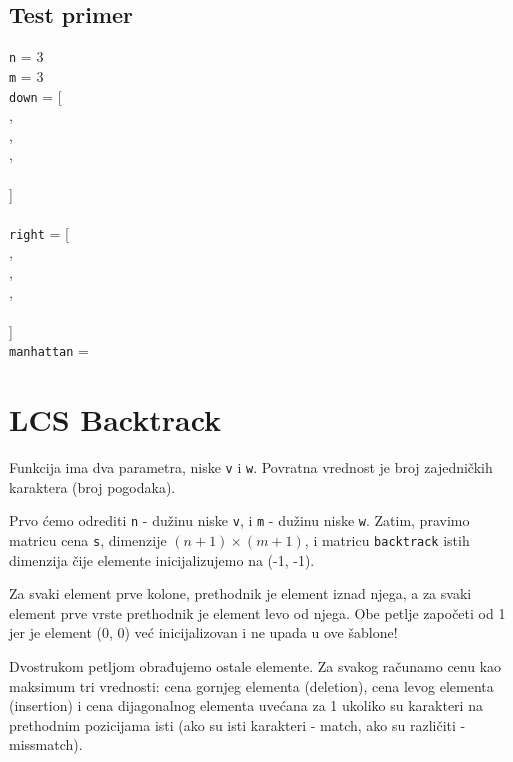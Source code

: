 

\subsection{Test primer}

\noindent \texttt{n} = 3
\\\texttt{m} = 3
\\ \noindent\texttt{down} = [
\\\indent[0, 0, 0, 0],
\\\indent[0, 1, 2, 1],
\\\indent[0, 1, 1, 1],
\\\indent[0, 1, 1, 1]
\\]
\\
\\ \texttt{right} = [
\\\indent[0, 0, 0, 1],
\\\indent[0, 3, 5, 1],
\\\indent[0, 1, 0, 1],
\\\indent[0, 1, 0, 1]
\\]
\\\texttt{manhattan} = 

\section{LCS Backtrack}

Funkcija ima dva parametra, niske \texttt{v} i \texttt{w}. Povratna vrednost je broj zajedničkih karaktera (broj pogodaka).

Prvo ćemo odrediti \texttt{n} - dužinu niske \texttt{v}, i \texttt{m} - dužinu niske \texttt{w}. Zatim, pravimo matricu cena \texttt{s}, dimenzije $(n+1) \times (m+1)$, i matricu \texttt{backtrack} istih dimenzija čije elemente inicijalizujemo na (-1, -1). 

Za svaki element prve kolone, prethodnik je element iznad njega, a za svaki element prve vrste prethodnik je element levo od njega. Obe petlje započeti od 1 jer je element (0, 0) već inicijalizovan i ne upada u ove šablone!

Dvostrukom petljom obrađujemo ostale elemente. Za svakog računamo cenu kao maksimum tri vrednosti: cena gornjeg elementa (deletion), cena levog elementa (insertion) i cena dijagonalnog elementa uvećana za 1 ukoliko su karakteri na prethodnim pozicijama isti (ako su isti karakteri - match, ako su različiti - missmatch). 

